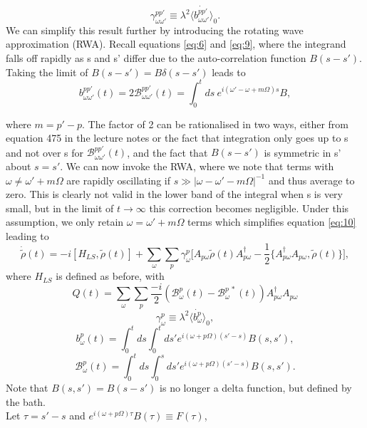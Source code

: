 \documentclass[10pt]{article}
\numberwithin{equation}{section}
\begin{document}
\begin{equation}
\gamma_{\omega\omega'}^{pp'} \equiv \lambda^{2} \langle \dot{b_{\omega\omega '}^{pp'}} \rangle_{0}.
\end{equation}
We can simplify this result further by introducing the rotating wave approximation (RWA). Recall equations \ref{eq:6} and \ref{eq:9}, where the integrand falls off rapidly as s and s' differ due to the auto-correlation function $B(s-s')$. Taking the limit of $B(s-s')= B\delta(s-s')$ leads to 
\begin{equation}\label{eq:8}
b_{\omega\omega '}^{pp'}(t) = 2\mathcal{B}_{\omega\omega '}^{pp'}(t) = \int_0^t ds\:  e^{i(\omega'-\omega+ m\Omega)s}B,
\end{equation} 

where $m = p'-p$. The factor of 2 can be rationalised in two ways, either from equation 475 in the lecture notes or the fact that integration only goes up to s and not over s for $\mathcal{B}_{\omega\omega '}^{pp'}(t)$, and the fact that $B(s-s')$ is symmetric in s' about $s=s'$.  We can now invoke the RWA, where we note that terms with $\omega \neq \omega' +m\Omega$ are rapidly oscillating if $s \gg |\omega - \omega' -m\Omega|^{-1}$ and thus average to zero. This is clearly not valid in the lower band of the integral when s is very small, but in the limit of  $t\to \infty$ this correction becomes negligible. Under this assumption, we only retain  $\omega = \omega' +m\Omega$ terms which simplifies equation \ref{eq:10} leading to
\begin{equation} \label{eq:11}
 \dot{\tilde{\rho}}(t)=  -i[H_{LS} ,\tilde{\rho}(t)] + \sum_{\omega}\sum_{p}\gamma_{\omega}^{p} \bigg[A_{p\omega}\tilde{\rho}(t)A_{p\omega}^{\dagger} - \frac{1}{2}\{A_{p\omega}^{\dagger}A_{p\omega},\tilde{\rho}(t)\}\bigg],
\end{equation}
where $H_{LS}$ is defined as before, with
\begin{equation} \label{eq:17}
Q(t) = \sum_{\omega}\sum_{p}\frac{-i}{2}(\mathcal{B}_{\omega}^{p}(t)  - \mathcal{B}_{\omega}^{p\:*}(t))A_{p\omega}^{\dagger}A_{p\omega}
\end{equation}
\begin{equation}
\gamma_{\omega}^{p} \equiv \lambda^{2} \langle \dot{b_{\omega}^{p}} \rangle_{0},
\end{equation}
\begin{equation} \label{eq:12}
b_{\omega}^{p}(t) = \int_0^t ds \int_0^t ds'  e^{i(\omega + p\Omega)(s'-s)}B(s,s'),
\end{equation}
\begin{equation} \label{eq:13}
\mathcal{B}_{\omega}^{p}(t) = \int_0^t ds \int_0^s ds'  e^{i(\omega + p\Omega)(s'-s)}B(s,s').
\end{equation}
Note that $B(s,s') = B(s-s')$ is no longer a delta function, but defined by the bath. \\
 Let $\tau = s'-s$ and  $e^{i(\omega + p\Omega)\tau}B(\tau) \equiv F(\tau)$, 
\end{document}
